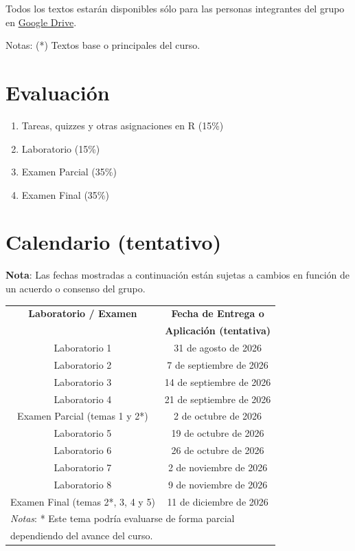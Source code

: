 \documentclass[letterpaper, 12pt]{article}
\begin{document}
Todos los textos estarán disponibles sólo para las personas integrantes del grupo en \href{https://drive.google.com/drive/folders/1eQlLrz9h-DBz7NLsZazcqHM0bCM204w_?usp=sharing}{Google Drive}.

Notas: (*) Textos base o principales del curso.

\section{Evaluación}
\begin{enumerate}
    \item Tareas, quizzes y otras asignaciones en R (15\%)
    \item Laboratorio (15\%)
    \item Examen Parcial (35\%)
    \item Examen Final (35\%)
\end{enumerate}

\section{Calendario (tentativo)}

\textbf{Nota}: Las fechas mostradas a continuación están sujetas a cambios en función de un acuerdo o consenso del grupo.

\begin{table}[htb]
\centering
\begin{tabular}{| c | c |}
\hline
\hline
    \textbf{Laboratorio / Examen} & \textbf{Fecha de Entrega o} \\
     & \textbf{Aplicación (tentativa)} \\
\hline \hline
    Laboratorio 1 & 31 de agosto de 2026 \\ \hline
    Laboratorio 2 & 7 de septiembre de 2026 \\ \hline
    Laboratorio 3 & 14 de septiembre de 2026 \\ \hline
    Laboratorio 4 & 21 de septiembre de 2026 \\ \hline
\hline
    Examen Parcial (temas 1 y 2*) & 2 de octubre de 2026 \\ \hline
\hline
    Laboratorio 5 & 19 de octubre de 2026 \\ \hline
    Laboratorio 6 & 26 de octubre de 2026 \\ \hline
    Laboratorio 7 & 2 de noviembre de 2026 \\ \hline
    Laboratorio 8 & 9 de noviembre de 2026 \\ \hline
\hline
    Examen Final (temas 2*, 3, 4 y 5) & 11 de diciembre de 2026 \\ \hline
\hline
\multicolumn{2}{l}{\textit{Notas}: * Este tema podría evaluarse de forma parcial} \\
\multicolumn{2}{l}{dependiendo del avance del curso.}\\
\end{tabular}
\label{Calendario}
\end{table}
\end{document}
